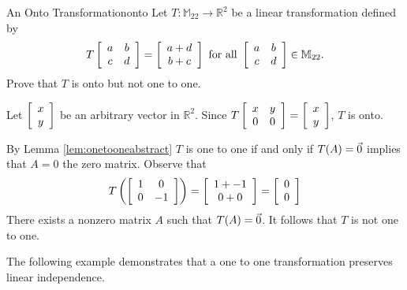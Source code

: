 \begin{example}{An Onto Transformation}{onto}
Let $T:\mathbb{M}_{22}\to\mathbb{R}^2$ be a linear transformation defined by
\[ T\left[\begin{array}{cc}
a & b \\ c & d \end{array}\right]
=
\left[\begin{array}{c}
a+d \\ b+c \end{array}\right]
\mbox{ for all }
\left[\begin{array}{cc}
a & b \\ c & d \end{array}\right] \in\mathbb{M}_{22}.\]
Prove that $T$ is onto but not one to one. 
\end{example}

\begin{solution}
Let $\left[\begin{array}{c} x \\ y \end{array}\right]$ be an arbitrary vector in $\mathbb{R}^2$. 
Since 
$T\left[\begin{array}{cc} x & y \\ 0 & 0 \end{array}\right]
=\left[\begin{array}{c} x \\ y \end{array}\right]$,
$T$  is onto.

By Lemma \ref{lem:onetooneabstract} $T$ is one to one if and only if $T(A) = \vec{0} $ implies that $A = 0$ the zero matrix.
Observe that
\[
T \left( \left[\begin{array}{cc} 1 & 0 \\ 0 & -1 \end{array}\right] \right)
=
\left[ \begin{array}{c}
1 + -1 \\
0 + 0 
\end{array}
\right]
=
\left[ \begin{array}{c}
0 \\
0 
\end{array}
\right]
\]
There exists a nonzero matrix $A$ such that $T(A) = \vec{0}$. It follows that $T$ is not one to one.
\end{solution}

The following example demonstrates that a one to one transformation preserves linear independence.

